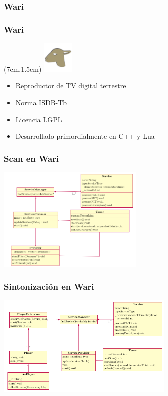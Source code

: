 \documentclass[a4paper,11pt]{beamer}
\begin{document}
		\subsubsection{Wari}
			\begin{frame}
				\frametitle{Wari}
				\begin{textblock*}{5cm}(7cm,1.5cm) %
					\includegraphics[width=1.5cm]{logo_wari.png}
				\end{textblock*}
				\begin{itemize}
					\item Reproductor de TV digital terrestre
					\item Norma ISDB-Tb
					\item Licencia LGPL
					\item Desarrollado primordialmente en C++ y Lua
				\end{itemize}
			\end{frame}

			\begin{frame}
				\frametitle{Scan en Wari}
				\begin{center}
					\includegraphics[width=7cm]{scan_wari.png}
				\end{center}
			\end{frame}

			\begin{frame}
				\frametitle{Sintonización en Wari}
				\begin{center}
					\includegraphics[width=8.5cm]{play_wari.png}
				\end{center}
			\end{frame}
\end{document}
